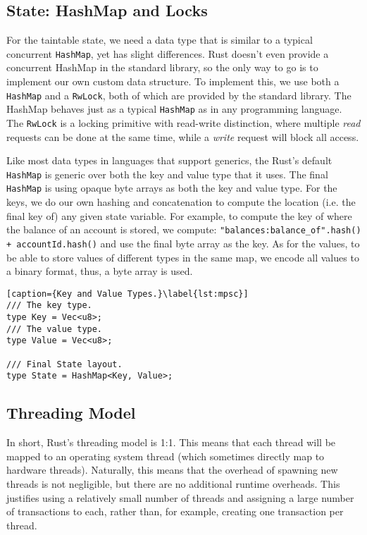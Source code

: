 \subsection{State: HashMap and Locks} \label{chap:impl:subsec:state_and_concurrent_map}

For the taintable state, we need a data type that is similar to a typical concurrent
\texttt{HashMap}\cite{barnatFastDynamicallySizedConcurrent2015}, yet has slight differences. Rust
doesn't even provide a concurrent HashMap in the standard library, so the only way to go is to
implement our own custom data structure. To implement this, we use both a \texttt{HashMap} and a
\texttt{RwLock}, both of which are provided by the standard library. The HashMap behaves just as a
typical \texttt{HashMap} as in any programming language. The \texttt{RwLock} is a locking primitive
with read-write distinction, where multiple \textit{read} requests can be done at the same time,
while a \textit{write} request will block all access.

Like most data types in languages that support generics, the Rust's default \texttt{HashMap} is
generic over both the key and value type that it uses. The final \texttt{HashMap} is using opaque
byte arrays as both the key and value type. For the keys, we do our own hashing and concatenation to
compute the location (i.e. the final key of) any given state variable. For example, to compute the
key of where the balance of an account is stored, we compute: \texttt{"balances:balance\_of".hash()
+ accountId.hash()} and use the final byte array as the key. As for the values, to be able to store
values of different types in the same map, we encode all values to a binary format, thus, a byte
array is used.

\begin{lstlisting}[caption={Key and Value Types.}\label{lst:mpsc}]
/// The key type. 
type Key = Vec<u8>; 
/// The value type. 
type Value = Vec<u8>;

/// Final State layout. 
type State = HashMap<Key, Value>;
\end{lstlisting}

\subsection{Threading Model}

In short, Rust's threading model is 1:1. This means that each thread will be mapped to an operating
system thread (which sometimes directly map to hardware threads). Naturally, this means that the
overhead of spawning new threads is not negligible, but there are no additional runtime overheads.
This justifies using a relatively small number of threads and assigning a large number of
transactions to each, rather than, for example, creating one transaction per thread.

